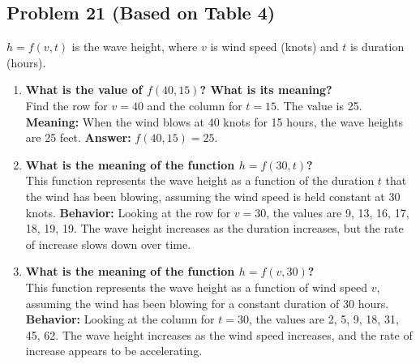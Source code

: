 \documentclass{article}
\begin{document}
\subsection{Problem 21 (Based on Table 4)}
$h = f(v, t)$ is the wave height, where $v$ is wind speed (knots) and $t$ is duration (hours).
\begin{enumerate}[label=\alph*.]
    \item \textbf{What is the value of $f(40, 15)$? What is its meaning?} \\
    Find the row for $v=40$ and the column for $t=15$. The value is 25.
    \textbf{Meaning:} When the wind blows at 40 knots for 15 hours, the wave heights are 25 feet.
    \textbf{Answer:} $f(40, 15) = 25$.
    \item \textbf{What is the meaning of the function $h = f(30, t)$?} \\
    This function represents the wave height as a function of the duration $t$ that the wind has been blowing, assuming the wind speed is held constant at 30 knots.
    \textbf{Behavior:} Looking at the row for $v=30$, the values are 9, 13, 16, 17, 18, 19, 19. The wave height increases as the duration increases, but the rate of increase slows down over time.
    \item \textbf{What is the meaning of the function $h = f(v, 30)$?} \\
    This function represents the wave height as a function of wind speed $v$, assuming the wind has been blowing for a constant duration of 30 hours.
    \textbf{Behavior:} Looking at the column for $t=30$, the values are 2, 5, 9, 18, 31, 45, 62. The wave height increases as the wind speed increases, and the rate of increase appears to be accelerating.
\end{enumerate}
\end{document}
